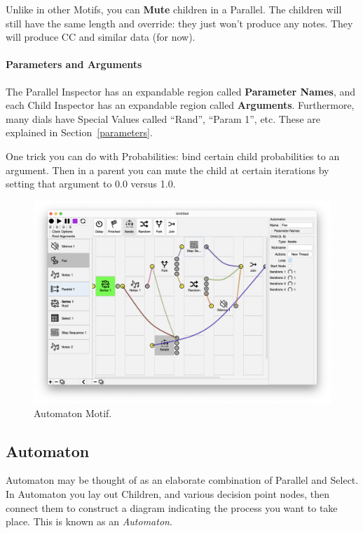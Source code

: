 \documentclass[twoside,10pt]{article}
\begin{document}
Unlike in other Motifs, you can {\bf Mute} children in a Parallel.  The children will still have the same length and override: they just won't produce any notes.  They will produce CC and similar data (for now).

\paragraph{Parameters and Arguments}

The Parallel Inspector has an expandable region called {\bf Parameter Names}, and each Child Inspector has an expandable region called {\bf Arguments}. Furthermore, many dials have Special Values called ``Rand'', ``Param 1'', etc.  These are explained in Section~\ref{parameters}.

One trick you can do with Probabilities: bind certain child probabilities to an argument.  Then in a parent you can mute the child at certain iterations by setting that argument to 0.0 versus 1.0.



\clearpage

\begin{figure}[t]
\centering
\includegraphics[width=6.5in]{Automaton}
\vspace{-2em}
\caption{Automaton Motif.}
\label{automaton}
\end{figure}

\subsection{Automaton}

Automaton may be thought of as an elaborate combination of Parallel and Select.  In Automaton you lay out Children, and various decision point nodes, then connect them to construct a diagram indicating the process you want to take place.  This is known as an {\it Automaton}.  
\end{document}

